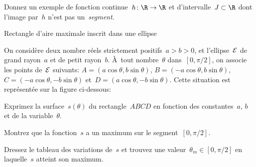 \question
Donnez un exemple de fonction continue~$h\colon\R\to\R$ et
d'intervalle~$J\subset\R$ dont l'image par~$h$ n'est pas
un~\em{segment}.


\exercise Rectangle d'aire maximale inscrit dans une ellipse

On considère deux nombre réels strictement positifs~$a > b > 0$, et
l'ellipse~$\cal E$ de grand rayon~$a$ et de petit rayon~$b$. À~tout
nombre~$\theta$ dans~$[0,\pi/2]$, on associe les points de~$\cal E$
suivants:
$A = (a\cos\theta, b\sin\theta)$,
$B = (-a\cos\theta, b\sin\theta)$,
$C = (-a\cos\theta, -b\sin\theta)$
et~$D = (a\cos\theta, -b\sin\theta)$.
Cette situation est représentée sur la figure ci-dessous:

\question
Exprimez la surface~$s(\theta)$ du rectangle~$ABCD$ en fonction des
constantes~$a$, $b$ et de la variable~$\theta$.

\question
Montrez que la fonction~$s$ a un maximum sur le segment~$[0,\pi/2]$.

\question
Dressez le tableau des variations de~$s$ et trouvez une
valeur~$\theta_m\in[0,\pi/2]$ en laquelle~$s$ atteint son maximum.

\bye

